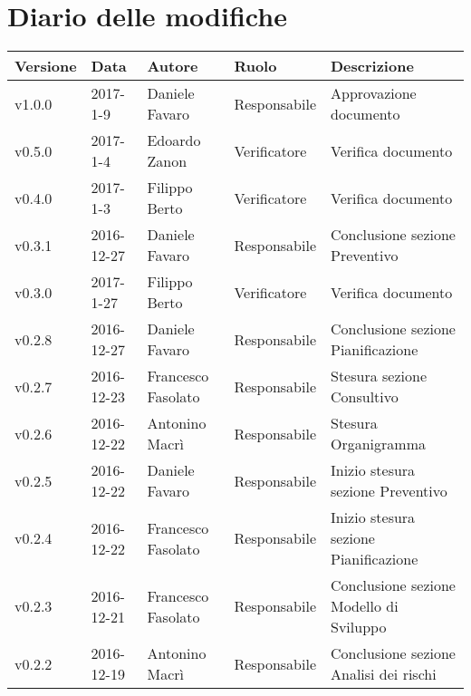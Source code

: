 \section*{Diario delle modifiche}
	\begin{longtabu} to \textwidth {
	X[3,c,m] 
	X[4,c,m]
	X[4,c,m]
	X[5,c,m]
	X[10,c,m]}
	\toprule
	\textbf{Versione} & \textbf{Data}  & \textbf{Autore} & \textbf{Ruolo} & \textbf{Descrizione}\\
	\midrule
	\endhead

		v1.0.0 & 2017-1-9 & Daniele Favaro & Responsabile & Approvazione documento \\ 
		\addlinespace[0.4em]
		\midrule
		\addlinespace[0.4em]
		v0.5.0 & 2017-1-4 & Edoardo Zanon & Verificatore & Verifica documento \\ 
		\addlinespace[0.4em]
		\midrule
		\addlinespace[0.4em]
		v0.4.0 & 2017-1-3 & Filippo Berto & Verificatore & Verifica documento \\ 
		\addlinespace[0.4em]
		\midrule
		\addlinespace[0.4em]
		v0.3.1 & 2016-12-27 & Daniele Favaro & Responsabile & Conclusione sezione Preventivo \\ 
		\addlinespace[0.4em]
		\midrule
		\addlinespace[0.4em]
		v0.3.0 & 2017-1-27 & Filippo Berto & Verificatore & Verifica documento \\ 
		\addlinespace[0.4em]
		\midrule
		\addlinespace[0.4em]
		v0.2.8 & 2016-12-27 & Daniele Favaro & Responsabile & Conclusione sezione Pianificazione \\ 
		\addlinespace[0.4em]
		\midrule
		\addlinespace[0.4em]
		v0.2.7 & 2016-12-23 & Francesco Fasolato & Responsabile & Stesura sezione Consultivo \\ 
		\addlinespace[0.4em]
		\midrule
		\addlinespace[0.4em]
		v0.2.6 & 2016-12-22 & Antonino Macrì & Responsabile & Stesura Organigramma \\ 
		\addlinespace[0.4em]
		\midrule
		\addlinespace[0.4em]
		v0.2.5 & 2016-12-22 & Daniele Favaro & Responsabile & Inizio stesura sezione Preventivo \\ 
		\addlinespace[0.4em]
		\midrule
		\addlinespace[0.4em]
		v0.2.4 & 2016-12-22 & Francesco Fasolato & Responsabile & Inizio stesura sezione Pianificazione \\ 
		\addlinespace[0.4em]
		\midrule
		\addlinespace[0.4em]
		v0.2.3 & 2016-12-21 & Francesco Fasolato & Responsabile & Conclusione sezione Modello di Sviluppo \\ 
		\addlinespace[0.4em]
		\midrule
		\addlinespace[0.4em]
		v0.2.2 & 2016-12-19 & Antonino Macrì & Responsabile & Conclusione sezione Analisi dei rischi  \\ 

\end{longtabu}
